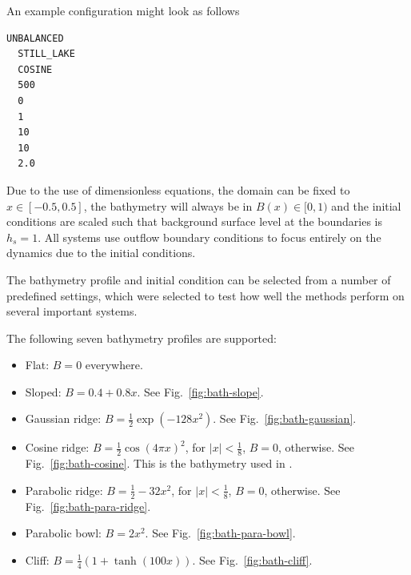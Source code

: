 An example configuration might look as follows

\begin{lstlisting}[caption=Configuration file]
  UNBALANCED
  STILL_LAKE
  COSINE
  500
  0
  1
  10
  10
  2.0
\end{lstlisting}

Due to the use of dimensionless equations, the domain can be fixed to $x \in [-0.5, 0.5]$, the bathymetry will always be in $B(x) \in [0,1)$ and the initial conditions are scaled such that background surface level at the boundaries is $h_s = 1$. All systems use outflow boundary conditions to focus entirely on the dynamics due to the initial conditions.

The bathymetry profile and initial condition can be selected from a number of predefined settings, which were selected to test how well the methods perform on several important systems.

The following seven bathymetry profiles are supported:

\begin{itemize}
  \item Flat: $B = 0$ everywhere.
  \item Sloped: $B = 0.4 + 0.8x$. See Fig.~\ref{fig:bath-slope}.
  \item Gaussian ridge: $B = \frac{1}{2} \exp (-128 x^2)$. See Fig.~\ref{fig:bath-gaussian}.
  \item Cosine ridge: $B = \frac{1}{2} \cos(4\pi x)^2$, for $|x| < \frac{1}{8}$, $B = 0$, otherwise. See Fig.~\ref{fig:bath-cosine}. This is the bathymetry used in \citet{leveque1998balancing}.
  \item Parabolic ridge: $B = \frac{1}{2} - 32x^2$, for $|x| < \frac{1}{8}$, $B = 0$, otherwise. See Fig.~\ref{fig:bath-para-ridge}.
  \item Parabolic bowl: $B = 2 x^2$. See Fig.~\ref{fig:bath-para-bowl}.
  \item Cliff: $B = \frac{1}{4} (1 + \tanh (100 x))$. See Fig.~\ref{fig:bath-cliff}.
\end{itemize}

